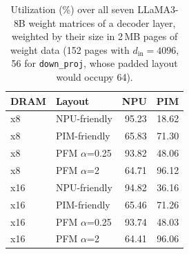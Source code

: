 \begin{table}[t]
\centering
\caption{Utilization (\%) over all seven LLaMA3-8B weight matrices of a decoder layer, weighted by their size in 2\,MB pages of weight data (152 pages with $d_{\mathrm{in}}{=}4096$, 56 for \texttt{down\_proj}, whose padded layout would occupy 64).}
\label{tab:weighted}
\begin{tabular}{llrr}
\toprule
DRAM & Layout & NPU & PIM \\
\midrule
x8 & NPU-friendly & 95.23 & 18.62 \\
x8 & PIM-friendly & 65.83 & 71.30 \\
x8 & PFM $\alpha$=0.25 & 93.82 & 48.06 \\
x8 & PFM $\alpha$=2 & 64.71 & 96.12 \\
\midrule
x16 & NPU-friendly & 94.82 & 36.16 \\
x16 & PIM-friendly & 65.46 & 71.26 \\
x16 & PFM $\alpha$=0.25 & 93.74 & 48.03 \\
x16 & PFM $\alpha$=2 & 64.41 & 96.06 \\
\bottomrule
\end{tabular}
\end{table}
